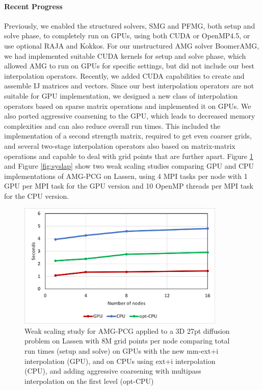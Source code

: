 \paragraph{Recent Progress}

Previously, we enabled the structured solvers, SMG and PFMG\cite{AsFa1996}, both setup and solve phase, to completely run on GPUs, using both CUDA or OpenMP4.5, or use optional RAJA and Kokkos.
For our unstructured AMG solver BoomerAMG, we had implemented suitable CUDA kernels for setup and solve phase, which allowed AMG to run on GPUs for specific settings, but did not include our best interpolation operators. Recently, we added CUDA capabilities to create and assemble IJ matrices and vectors. Since our best interpolation operators are not suitable for GPU implementation, we designed a new class of interpolation operators based on sparse matrix operations\cite{LiSY2020} and implemented it on GPUs. We also ported aggressive coarsening to the GPU, which leads to decreased memory complexities and can also reduce overall run times. This included the implementation of a second strength matrix, required to get even coarser grids, and several two-stage interpolation operators also based on matrix-matrix operations and capable to deal with grid points that are further apart. Figure \ref{fig:27pt} and Figure \ref{fig:syslap} show two weak scaling studies comparing GPU and CPU implementations of AMG-PCG on Lassen, using 4 MPI tasks per node with 1 GPU per MPI task for the GPU version and 10 OpenMP threads per MPI task for the CPU version.

\begin{figure}[bth]
\centering
	\includegraphics[width=3.9in]{projects/2.3.3-MathLibs/2.3.3.12-SUNDIALS-hypre/mm-exti-27pt-200.png}
	\caption{\label{fig:27pt} Weak scaling study for AMG-PCG applied to a 3D 27pt diffusion problem on Lassen with 8M grid points per node comparing total run times (setup and solve) on GPUs with the new mm-ext+i interpolation (GPU), and on CPUs using ext+i interpolation (CPU), and adding aggressive coarsening with multipass interpolation on the first level (opt-CPU)}
\end{figure}

